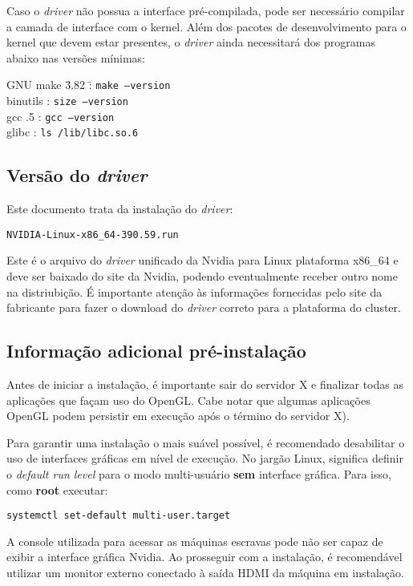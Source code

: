 \documentclass[twoside,a4paper,12pt,english]{inac17}
\begin{document}
Caso o \textit{driver} não possua a interface pré-compilada, pode ser necessário 
compilar a camada de interface com o kernel. Além dos pacotes de desenvolvimento 
para o kernel que devem estar presentes, o \textit{driver} ainda necessitará dos 
programas abaixo nas versões mínimas:

\begin{tabbing}
GNU make	 \= 3.82	\= : \= \texttt{make --version} \\
binutils	 	\> : \> \texttt{size --version} \\
gcc 		 .5	\> : \> \texttt{gcc --version} \\
glibc	 	\> : \> \texttt{ls /lib/libc.so.6}\\
\end{tabbing}


\subsection{Versão do \textit{driver}}

Este documento trata da instalação do \textit{driver}:

\texttt{NVIDIA-Linux-x86\_64-390.59.run}

Este é o arquivo do \textit{driver} unificado da Nvidia para 
Linux plataforma x86\_64 e deve ser baixado do site da Nvidia, podendo  eventualmente receber outro nome na distriubição. É importante 
atenção às informações fornecidas pelo site da fabricante para 
fazer o download do \textit{driver} correto para a plataforma 
do cluster.

\subsection{Informação adicional pré-instalação}

Antes de iniciar a instalação, é importante sair do servidor X e 
finalizar todas as aplicações que façam uso do OpenGL. Cabe notar 
que algumas aplicações OpenGL podem persistir em execução após 
o término do servidor X).

Para garantir uma instalação o mais suável possível, é recomendado 
desabilitar o uso de interfaces gráficas em nível de execução. No 
jargão Linux, significa definir o \textit{default run level} para 
o modo multi-usuário \textbf{sem} interface gráfica. Para isso, 
como \textbf{root} executar:

\texttt{systemctl set-default multi-user.target}

\begin{shadedbox}
A console utilizada para acessar as máquinas escravas pode não ser capaz 
de exibir a interface gráfica Nvidia. Ao prosseguir com a instalação, é recomendável 
utilizar um monitor externo conectado à saída HDMI da máquina em instalação.
\end{shadedbox}
\end{document}
